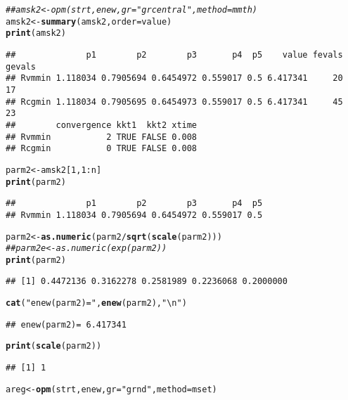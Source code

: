 \documentclass[11pt]{article}\usepackage[]{graphicx}\usepackage[]{color}
\makeatletter
\newcommand{\hlnum}[1]{\textcolor[rgb]{0.686,0.059,0.569}{#1}}%
\newcommand{\hlstr}[1]{\textcolor[rgb]{0.192,0.494,0.8}{#1}}%
\newcommand{\hlcom}[1]{\textcolor[rgb]{0.678,0.584,0.686}{\textit{#1}}}%
\newcommand{\hlopt}[1]{\textcolor[rgb]{0,0,0}{#1}}%
\newcommand{\hlstd}[1]{\textcolor[rgb]{0.345,0.345,0.345}{#1}}%
\newcommand{\hlkwb}[1]{\textcolor[rgb]{0.69,0.353,0.396}{#1}}%
\newcommand{\hlkwc}[1]{\textcolor[rgb]{0.333,0.667,0.333}{#1}}%
\newcommand{\hlkwd}[1]{\textcolor[rgb]{0.737,0.353,0.396}{\textbf{#1}}}%
\newenvironment{kframe}{%
 \def\at@end@of@kframe{}%
 \ifinner\ifhmode%
  \def\at@end@of@kframe{\end{minipage}}%
  \begin{minipage}{\columnwidth}%
 \fi\fi%
 \def\FrameCommand##1{\hskip\@totalleftmargin \hskip-\fboxsep
 \colorbox{shadecolor}{##1}\hskip-\fboxsep
     \hskip-\linewidth \hskip-\@totalleftmargin \hskip\columnwidth}%
 \MakeFramed {\advance\hsize-\width
   \@totalleftmargin\z@ \linewidth\hsize
   \@setminipage}}%
 {\par\unskip\endMakeFramed%
 \at@end@of@kframe}
\newenvironment{knitrout}{}{} %
\makeatother
\begin{document}
\begin{knitrout}
\begin{kframe}
{\ttfamily\noindent\color{warningcolor}{\#\# Warning in bmchk(par, lower = lower, upper = upper): Masks (fixed parameters) set by bmchk due to tight bounds. CAUTION!!}}\begin{alltt}
\hlcom{## amsk2 <- opm(strt, enew, gr="grcentral", method=mmth)}
\hlstd{amsk2} \hlkwb{<-} \hlkwd{summary}\hlstd{(amsk2,} \hlkwc{order}\hlstd{=value)}
\hlkwd{print}\hlstd{(amsk2)}
\end{alltt}
\begin{verbatim}
##              p1        p2        p3       p4  p5    value fevals gevals
## Rvmmin 1.118034 0.7905694 0.6454972 0.559017 0.5 6.417341     20     17
## Rcgmin 1.118034 0.7905695 0.6454973 0.559017 0.5 6.417341     45     23
##        convergence kkt1  kkt2 xtime
## Rvmmin           2 TRUE FALSE 0.008
## Rcgmin           0 TRUE FALSE 0.008
\end{verbatim}
\begin{alltt}
\hlstd{parm2} \hlkwb{<-} \hlstd{amsk2[}\hlnum{1}\hlstd{,} \hlnum{1}\hlopt{:}\hlstd{n]}
\hlkwd{print}\hlstd{(parm2)}
\end{alltt}
\begin{verbatim}
##              p1        p2        p3       p4  p5
## Rvmmin 1.118034 0.7905694 0.6454972 0.559017 0.5
\end{verbatim}
\begin{alltt}
\hlstd{parm2} \hlkwb{<-} \hlkwd{as.numeric}\hlstd{(parm2}\hlopt{/}\hlkwd{sqrt}\hlstd{(}\hlkwd{scale}\hlstd{(parm2)))}
\hlcom{## parm2e<-as.numeric(exp(parm2))}
\hlkwd{print}\hlstd{(parm2)}
\end{alltt}
\begin{verbatim}
## [1] 0.4472136 0.3162278 0.2581989 0.2236068 0.2000000
\end{verbatim}
\begin{alltt}
\hlkwd{cat}\hlstd{(}\hlstr{"enew(parm2)="}\hlstd{,} \hlkwd{enew}\hlstd{(parm2),}\hlstr{"\textbackslash{}n"}\hlstd{)}
\end{alltt}
\begin{verbatim}
## enew(parm2)= 6.417341
\end{verbatim}
\begin{alltt}
\hlkwd{print}\hlstd{(}\hlkwd{scale}\hlstd{(parm2))}
\end{alltt}
\begin{verbatim}
## [1] 1
\end{verbatim}
\begin{alltt}
\hlstd{areg}\hlkwb{<-} \hlkwd{opm}\hlstd{(strt, enew,} \hlkwc{gr}\hlstd{=}\hlstr{"grnd"}\hlstd{,} \hlkwc{method}\hlstd{=mset)}
\end{alltt}



\end{kframe}
\end{knitrout}
\end{document}
